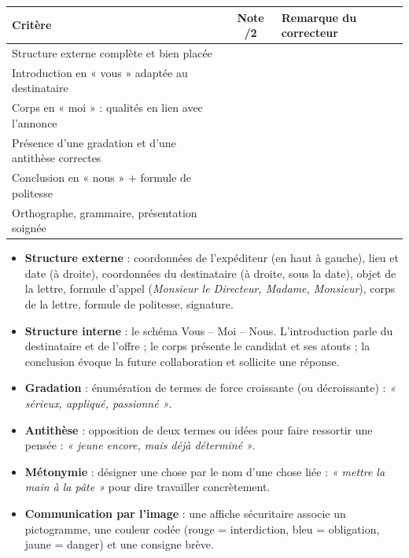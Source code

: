 \documentclass[11pt]{article}
\newcommand{\cle}[1]{{\popxbold\color{popdark}#1}}
\newcounter{popsec}
\newcounter{popsub}
\newcommand{\courssub}[1]{%
  \stepcounter{popsub}%
  \par\vspace{9pt}\noindent{\popxbold\fontsize{11.5}{13}\selectfont\color{popink}{\color{poporange}\thepopsec.\thepopsub}\hspace{6pt}#1}\par\nopagebreak\vspace{4pt}
}
\begin{document}
\begin{center}
\begin{tabularx}{\linewidth}{|l|c|X|}
\hline
\rowcolor{popblueL} \textbf{Critère} & \textbf{Note /2} & \textbf{Remarque du correcteur} \\
\hline
Structure externe complète et bien placée & & \\
\hline
Introduction en « vous » adaptée au destinataire & & \\
\hline
Corps en « moi » : qualités en lien avec l'annonce & & \\
\hline
Présence d'une gradation et d'une antithèse correctes & & \\
\hline
Conclusion en « nous » + formule de politesse & & \\
\hline
Orthographe, grammaire, présentation soignée & & \\
\hline
\end{tabularx}
\end{center}

\courssub{Ressources à mobiliser}

\begin{aretenir}
\begin{itemize}
\item \textbf{Structure externe} : coordonnées de l'expéditeur (en haut à gauche), lieu et date (à droite), coordonnées du destinataire (à droite, sous la date), objet de la lettre, formule d'appel (\emph{Monsieur le Directeur, Madame, Monsieur}), corps de la lettre, formule de politesse, signature.
\item \textbf{Structure interne} : le schéma \cle{Vous -- Moi -- Nous}. L'introduction parle du destinataire et de l'offre ; le corps présente le candidat et ses atouts ; la conclusion évoque la future collaboration et sollicite une réponse.
\item \textbf{Gradation} : énumération de termes de force croissante (ou décroissante) : \emph{« sérieux, appliqué, passionné »}.
\item \textbf{Antithèse} : opposition de deux termes ou idées pour faire ressortir une pensée : \emph{« jeune encore, mais déjà déterminé »}.
\item \textbf{Métonymie} : désigner une chose par le nom d'une chose liée : \emph{« mettre la main à la pâte »} pour dire travailler concrètement.
\item \textbf{Communication par l'image} : une affiche sécuritaire associe un pictogramme, une couleur codée (rouge = interdiction, bleu = obligation, jaune = danger) et une consigne brève.
\end{itemize}
\end{aretenir}
\end{document}
